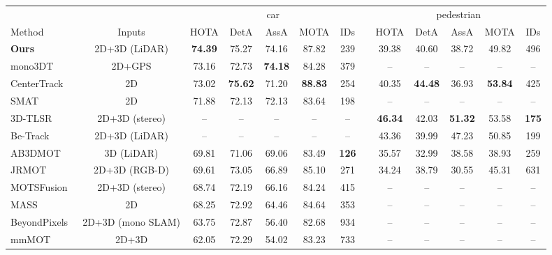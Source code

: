\documentclass[letterpaper, 10 pt, conference]{ieeeconf}
\begin{document}
\begin{table*}
\begin{center}
\vspace{+8pt}
\begin{tabular}
{l|c|c|c|c|c|c|c|c|c|c|c|c}

\toprule
&  & \multicolumn{5}{c|}{car} && \multicolumn{5}{c}{pedestrian}  \\
Method                                 & Inputs             & HOTA  & DetA  & AssA  & MOTA  & IDs          &          & HOTA  & DetA  & AssA  & MOTA  & IDs \\

\hline\hline
\textbf{Ours}                           & 2D+3D (LiDAR)     & \textbf{74.39} & 75.27 & 74.16 & 87.82 & 239          &          & 39.38 & 40.60 & 38.72 & 49.82 & 496 \\
mono3DT~\cite{Hu_2019_ICCV}             & 2D+GPS            & 73.16 & 72.73 & \textbf{74.18} & 84.28 & 379          &          & -- & -- & -- & -- & -- \\
CenterTrack~\cite{zhou2020tracking}     & 2D                & 73.02 & \textbf{75.62} & 71.20 & \textbf{88.83} & 254          &          & 40.35 & \textbf{44.48 }& 36.93 & \textbf{53.84} & 425 \\
SMAT~\cite{gonzalez2020smat}            & 2D                & 71.88 & 72.13 & 72.13 & 83.64 & 198          &          & -- & -- & -- & -- & -- \\
3D-TLSR~\cite{nguyen20203d}             & 2D+3D (stereo)    & --    &  --   & --    & --    & --           &          & \textbf{46.34} & 42.03 & \textbf{51.32} & 53.58 & \textbf{175} \\
Be-Track~\cite{s19020391}               & 2D+3D (LiDAR)     & --    &  --   & --    & --    & --           &          & 43.36 & 39.99 & 47.23 & 50.85 & 199 \\
AB3DMOT~\cite{Weng2020_AB3DMOT}         & 3D (LiDAR)        & 69.81 & 71.06 & 69.06 & 83.49 & \textbf{126}          &          & 35.57 & 32.99 & 38.58 & 38.93 & 259 \\
JRMOT~\cite{shenoi2020jrmot}            & 2D+3D (RGB-D)     & 69.61 & 73.05 & 66.89 & 85.10 & 271          &          & 34.24 & 38.79 & 30.55 & 45.31 & 631 \\
MOTSFusion~\cite{luiten19arxiv}         & 2D+3D (stereo)    & 68.74 & 72.19 & 66.16 & 84.24 & 415          &          & -- & -- & -- & -- & -- \\
MASS~\cite{8782450}                     & 2D                & 68.25 & 72.92 & 64.46 & 84.64 & 353          &          & -- & -- & -- & -- & -- \\
BeyondPixels~\cite{Sharma18ICRA}        & 2D+3D (mono SLAM) & 63.75 & 72.87 & 56.40 & 82.68 & 934          &          & -- & -- & -- & -- & -- \\
mmMOT~\cite{Zhang_2019_ICCV}            & 2D+3D             & 62.05 & 72.29 & 54.02 & 83.23 & 733          &          & -- & -- & -- & -- & -- \\


\end{tabular}
\end{center}
\end{table*}
\end{document}
